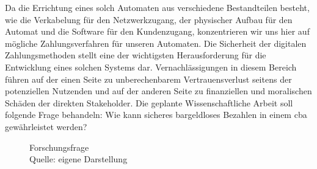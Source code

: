 Da die Errichtung eines solch Automaten aus verschiedene Bestandteilen besteht, wie die Verkabelung 
für den Netzwerkzugang, der physischer Aufbau für den Automat und die Software für den Kundenzugang, 
konzentrieren wir uns hier auf mögliche Zahlungsverfahren für unseren Automaten. Die Sicherheit der 
digitalen Zahlungsmethoden stellt eine der wichtigsten Herausforderung für die Entwicklung eines 
solchen Systems dar. Vernachlässigungen in diesem Bereich führen auf der einen Seite zu unberechenbarem
Vertrauensverlust seitens der potenziellen Nutzenden und auf der anderen Seite zu finanziellen und 
moralischen Schäden der direkten Stakeholder. Die geplante Wissenschaftliche Arbeit soll folgende 
Frage behandeln: Wie kann sicheres bargeldloses Bezahlen in einem \acrshort{cba} gewährleistet
werden? 

\vspace*{1cm}
\begin{figure}[H]
    \caption{Forschungsfrage \\ Quelle: eigene Darstellung}
    \label{fig:diagramrecherche}
\end{figure}